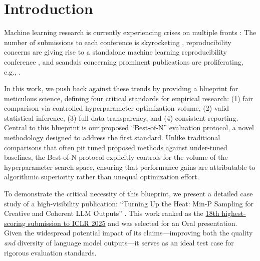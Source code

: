 \section{Introduction}
\label{sec:introduction}

Machine learning research is currently experiencing crises on multiple fronts \citep{kim2025position,schaeffer2025positionmachinelearningconferences}:
The number of submissions to each conference is skyrocketing \citep{papercopilot2025neurips}, reproducibility concerns are giving rise to a standalone machine learning reproducibility conference \citep{pineau2017iclr,sinha2023mlrc}, and scandals concerning prominent publications are proliferating, e.g., 
\citep{carlini2020instahide,
agarwal2021deep,carlini2021neuracryptprivate,
carlini2022freelunchprivacyfree,kirsch2022bayesianmodelselection,schaeffer2022nofreelunch,
orabona2023yetanothericmlawardfiasco,schaeffer2023mirage,
gerstgrasser2024modelcollapseinevitablebreaking,kirsch2024rholossattribution,markov2024falsedawnreevaluatinggoogles,schaeffer2024does,
chandak2025llmrlincorrect,golechha2025intricacies,ivanova2025towardsmorerigorous,kazdan2025collapsethriveperilspromises,maini2025reassessingemnlp2024s,zhang2025evaluatingrobustnessensembleeverywhere, schaeffer2025positionmodelcollapsedoes}.

In this work, we push back against these trends by providing a blueprint for meticulous science, defining four critical standards for empirical research: (1) fair comparison via controlled hyperparameter optimization volume, (2) valid statistical inference, (3) full data transparency, and (4) consistent reporting. Central to this blueprint is our proposed ``Best-of-N'' evaluation protocol, a novel methodology designed to address the first standard. Unlike traditional comparisons that often pit tuned proposed methods against under-tuned baselines, the Best-of-N protocol explicitly controls for the volume of the hyperparameter search space, ensuring that performance gains are attributable to algorithmic superiority rather than unequal optimization effort.

To demonstrate the critical necessity of this blueprint, we present a detailed case study of a high-visibility publication: ``Turning Up the Heat: Min-P Sampling for Creative and Coherent LLM Outputs'' \citep{nguyen2024minp}. This work ranked as the \href{https://papercopilot.com/statistics/iclr-statistics/iclr-2025-statistics/}{18th highest-scoring submission to ICLR 2025} and was selected for an Oral presentation. Given the widespread potential impact of its claims—improving both the quality \emph{and} diversity of language model outputs—it serves as an ideal test case for rigorous evaluation standards.

